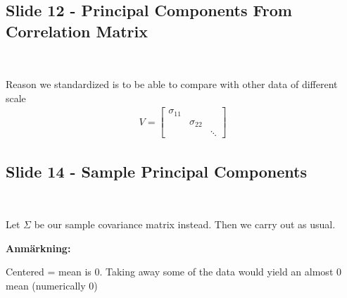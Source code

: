 \subsection{Slide 12 - Principal Components From Correlation Matrix}\hfill\\\par
\noindent Reason we standardized is to be able to compare with other data of different scale
\begin{equation*}
  \begin{gathered}
    V = \begin{bmatrix}\sigma_{11}&&\\&\sigma_{22}&\\&&\ddots\end{bmatrix}
  \end{gathered}
\end{equation*}
\par\bigskip
\subsection{Slide 14 - Sample Principal Components}\hfill\\\par
\noindent Let $\Sigma$ be our sample covariance matrix instead. Then we carry out as usual.
\par\bigskip
\noindent\textbf{Anmärkning:}\par
\noindent Centered = mean is 0. Taking away some of the data would yield an almost 0 mean (numerically 0)
\par\bigskip
